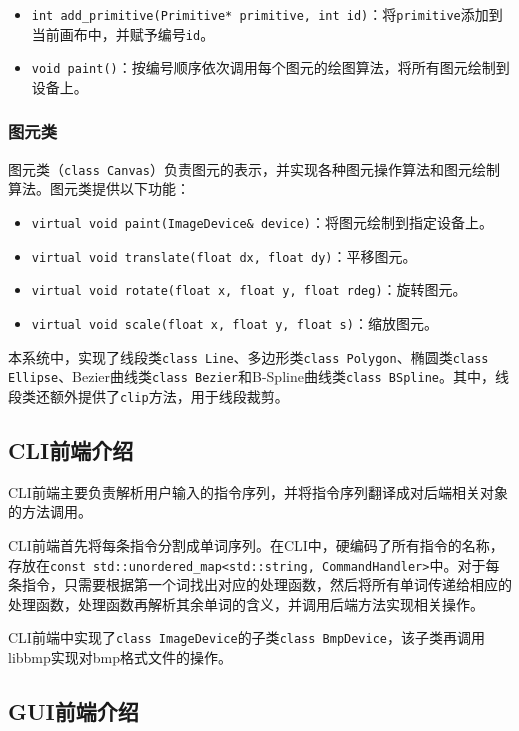 \documentclass[a4paper,12pt]{article}
\begin{document}
\begin{itemize}
	\item \lstinline|int add_primitive(Primitive* primitive, int id)|：将\lstinline|primitive|添加到当前画布中，并赋予编号\lstinline|id|。
	\item \lstinline|void paint()|：按编号顺序依次调用每个图元的绘图算法，将所有图元绘制到设备上。
\end{itemize}

\subsubsection{图元类}
图元类（\lstinline|class Canvas|）负责图元的表示，并实现各种图元操作算法和图元绘制算法。图元类提供以下功能：

\begin{itemize}
	\item \lstinline|virtual void paint(ImageDevice& device)|：将图元绘制到指定设备上。
	\item \lstinline|virtual void translate(float dx, float dy)|：平移图元。
	\item \lstinline|virtual void rotate(float x, float y, float rdeg)|：旋转图元。
	\item \lstinline|virtual void scale(float x, float y, float s)|：缩放图元。
\end{itemize}

本系统中，实现了线段类\lstinline|class Line|、多边形类\lstinline|class Polygon|、椭圆类\lstinline|class Ellipse|、Bezier曲线类\lstinline|class Bezier|和B-Spline曲线类\lstinline|class BSpline|。其中，线段类还额外提供了\lstinline|clip|方法，用于线段裁剪。

\subsection{CLI前端介绍}

CLI前端主要负责解析用户输入的指令序列，并将指令序列翻译成对后端相关对象的方法调用。

CLI前端首先将每条指令分割成单词序列。在CLI中，硬编码了所有指令的名称，存放在\lstinline|const std::unordered_map<std::string, CommandHandler>|中。对于每条指令，只需要根据第一个词找出对应的处理函数，然后将所有单词传递给相应的处理函数，处理函数再解析其余单词的含义，并调用后端方法实现相关操作。

CLI前端中实现了\lstinline|class ImageDevice|的子类\lstinline|class BmpDevice|，该子类再调用libbmp\cite{github:libbmp}实现对bmp格式文件的操作。

\subsection{GUI前端介绍}
\end{document}

